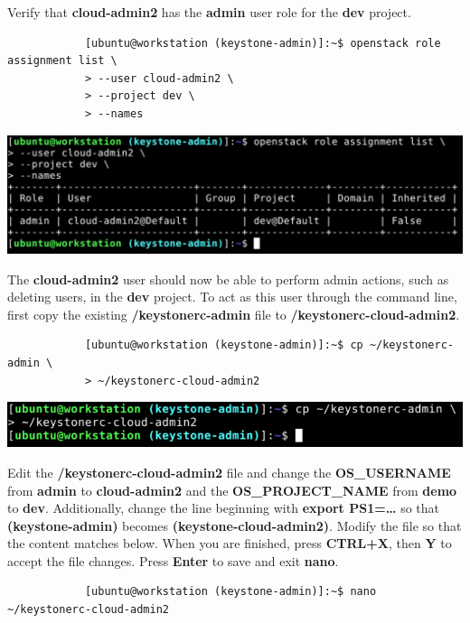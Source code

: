 \documentclass[letterpaper, 12pt]{article}
\begin{document}
\begin{enumerate}
    \begin{labstep}
        Verify that \textbf{cloud-admin2} has the \textbf{admin} user role for the \textbf{dev} project.
        \begin{lstlisting}
            [ubuntu@workstation (keystone-admin)]:~$ openstack role assignment list \
            > --user cloud-admin2 \
            > --project dev \
            > --names
        \end{lstlisting}

        \begin{center}
            \includegraphics[width=\linewidth]{images/appendix/step3.png}
        \end{center}
    \end{labstep}

    \begin{labstep}
        The \textbf{cloud-admin2} user should now be able to perform admin actions, such as deleting users, in the \textbf{dev} project.
        To act as this user through the command line, first copy the existing \textbf{\texttildemid/keystonerc-admin} file to \textbf{\texttildemid/keystonerc-cloud-admin2}.
        \begin{lstlisting}
            [ubuntu@workstation (keystone-admin)]:~$ cp ~/keystonerc-admin \
            > ~/keystonerc-cloud-admin2
        \end{lstlisting}

        \begin{center}
            \includegraphics[width=\linewidth]{images/appendix/step4.png}
        \end{center}
    \end{labstep}

    \begin{labstep}
        Edit the \textbf{\texttildemid/keystonerc-cloud-admin2} file and change the \textbf{OS\_USERNAME} from \textbf{admin} to \textbf{cloud-admin2} and the \textbf{OS\_PROJECT\_NAME} from \textbf{demo} to \textbf{dev}.
        Additionally, change the line beginning with \textbf{export PS1=…} so that \textbf{(keystone-admin)} becomes \textbf{(keystone-cloud-admin2)}.
        Modify the file so that the content matches below.
        When you are finished, press \textbf{CTRL+X}, then \textbf{Y} to accept the file changes.
        Press \textbf{Enter} to save and exit \textbf{nano}.
        \begin{lstlisting}
            [ubuntu@workstation (keystone-admin)]:~$ nano ~/keystonerc-cloud-admin2
        \end{lstlisting}


\end{labstep}
\end{enumerate}
\end{document}
